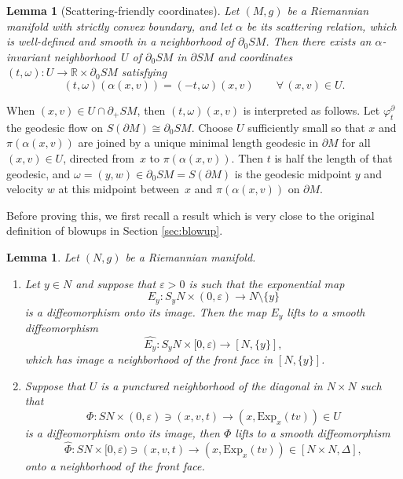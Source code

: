 \documentclass[JEP,XML,SOM,Unicode,NoFloatCountersInSection, NoEqCountersInSection,published]{cedram}
\let\backslash\setminus
\newenvironment{enumeratei}
{\bgroup\def\theenumi{\roman{enumi}}\def\theenumii{\arabic{enumii}}\begin{enumerate}}
{\end{enumerate}\egroup}
\theoremstyle{plain}
\newtheorem{Lemma}[Theorem]{Lemma}
\theoremstyle{definition}
\theoremstyle{remark}
\def\Rm{{\mathbb{R}}}
\newcommand{\del}{\partial}
\begin{document}
\begin{Lemma}[Scattering-friendly coordinates]\label{lem:scatcoords}
Let $(M,g)$ be a Riemannian manifold with strictly convex boundary, and let $\alpha$ be its scattering relation, which is well-defined and smooth in
a neighborhood of $\partial_0 SM$. Then there exists an $\alpha$-invariant neighborhood~$U$ of $\partial_0 SM$ in $\partial SM$ and coordinates $(t,\omega)\colon U\to \Rm\times \partial_0 SM$ satisfying\vspace*{-3pt}\enlargethispage{.5\baselineskip}
\begin{equation*}
(t,\omega) (\alpha(x,v)) = (-t,\omega)(x,v) \qquad \forall\, (x,v)\in U.
\end{equation*}
\end{Lemma}

When $(x,v)\in U\cap \partial_+ SM$, then $(t,\omega)(x,v)$ is interpreted as follows. Let $\varphi_t^\partial$ the geodesic
flow on $S(\partial M) \cong \partial_0 SM$. Choose $U$ sufficiently small so that $x$ and $\pi(\alpha(x,v))$ are joined
by a unique minimal length geodesic in $\del M$ for all $(x,v) \in U$, directed from~$x$ to $\pi(\alpha(x,v))$. Then $t$ is half the length of that geodesic, and $\omega = (y,w)\in \partial_0 SM = S(\partial M)$ is the geodesic midpoint $y$ and velocity $w$ at this midpoint between~$x$ and $\pi(\alpha(x,v))$ on $\del M$.

Before proving this, we first recall a result which is very close to the original definition of blowups in Section \ref{sec:blowup}.
\begin{Lemma}\label{lem:lift}
Let $(N,g)$ be a Riemannian manifold.
\begin{enumeratei}
\item\label{lem:lifti}
Let $y\in N$ and suppose that $\varepsilon>0$ is such that the exponential map\vspace*{-3pt}
\[
E_y \colon S_y N \times (0,\varepsilon) \to N\backslash\{y\}
\]
is a diffeomorphism onto its image. Then the map $E_y$ lifts to a smooth diffeomorphism\vspace*{-3pt}
\begin{equation*}
\widehat{E_y}\colon S_y N\times [0,\varepsilon) \to [N,\{y\}],
\end{equation*}
which has image a neighborhood of the front face in $[N, \{y\}]$.

\item\label{lem:liftii}
Suppose that $U$ is a punctured neighborhood of the diagonal in $N\times N$ such that\vspace*{-3pt}
\begin{equation*}
\Phi\colon SN\times (0,\varepsilon) \ni (x,v,t) \to (x,\mathrm{Exp}_{x}(tv)) \in U
\end{equation*}
is a diffeomorphism onto its image, then $\Phi$ lifts to a smooth diffeomorphism
\begin{equation*}
\widehat{\Phi}\colon SN\times [0,\varepsilon) \ni (x,v,t) \to (x,\mathrm{Exp}_{x}(tv)) \in [N\times N,\Delta],
\end{equation*}
onto a neighborhood of the front face.
\end{enumeratei}
\end{Lemma}
\end{document}
